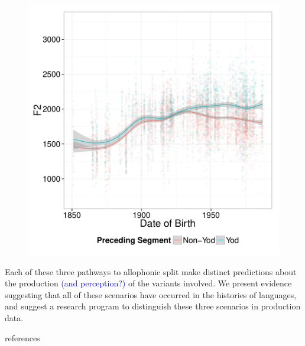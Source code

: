 \documentclass[10pt,letterpaper]{article}
\begin{document}
\begin{figure}
\includegraphics[width=0.4\linewidth]{By_Token_Old_Preceding.pdf}
\end{figure}


\noindent Each of these three pathways to allophonic split make distinct predictions about the production \textcolor{blue}{(and perception?)} of the variants involved. We present evidence suggesting that all of these scenarios have occurred in the histories of languages, and suggest a research program to distinguish these three scenarios in production data. 


references
\end{document}
